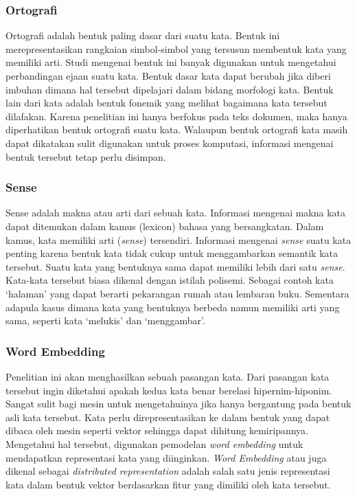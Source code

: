 \subsubsection{Ortografi}
Ortografi adalah bentuk paling dasar dari suatu kata. Bentuk ini merepresentasikan rangkaian simbol-simbol yang tersusun membentuk kata yang memiliki arti. Studi mengenai bentuk ini banyak digunakan untuk mengetahui perbandingan ejaan suatu kata. Bentuk dasar kata dapat berubah jika diberi imbuhan dimana hal tersebut dipelajari dalam bidang morfologi kata. Bentuk lain dari kata adalah bentuk fonemik yang melihat bagaimana kata tersebut dilafakan. Karena penelitian ini hanya berfokus pada teks dokumen, maka hanya diperhatikan bentuk ortografi suatu kata. Walaupun bentuk ortografi kata masih dapat dikatakan sulit digunakan untuk proses komputasi, informasi mengenai bentuk tersebut tetap perlu disimpan.

\subsubsection{Sense}
Sense adalah makna atau arti dari sebuah kata. Informasi mengenai makna kata dapat ditemukan dalam kamus (lexicon) bahasa yang bersangkatan. Dalam kamus, kata memiliki arti (\textit{sense}) tersendiri. Informasi mengenai \textit{sense} suatu kata penting karena bentuk kata tidak cukup untuk menggambarkan semantik kata tersebut. Suatu kata yang bentuknya sama dapat memiliki lebih dari satu \textit{sense}. Kata-kata tersebut biasa dikenal dengan istilah polisemi. Sebagai contoh kata `halaman' yang dapat berarti pekarangan rumah atau lembaran buku. Sementara adapula kasus dimana kata yang bentuknya berbeda namun memiliki arti yang sama, seperti kata `melukis' dan `menggambar'.

\subsubsection{Word Embedding}
Penelitian ini akan menghasilkan sebuah pasangan kata. Dari pasangan kata tersebut ingin diketahui apakah kedua kata benar berelasi hipernim-hiponim. Sangat sulit bagi mesin untuk mengetahuinya jika hanya bergantung pada bentuk asli kata tersebut. Kata perlu direpresentasikan ke dalam bentuk yang dapat dibaca oleh mesin seperti vektor sehingga dapat dihitung kemiripannya. Mengetahui hal tersebut, digunakan pemodelan \textit{word embedding} untuk mendapatkan representasi kata yang diinginkan. \textit{Word Embedding} atau juga dikenal sebagai \textit{distributed representation} adalah salah satu jenis representasi kata dalam bentuk vektor berdasarkan fitur yang dimiliki oleh kata tersebut. 

